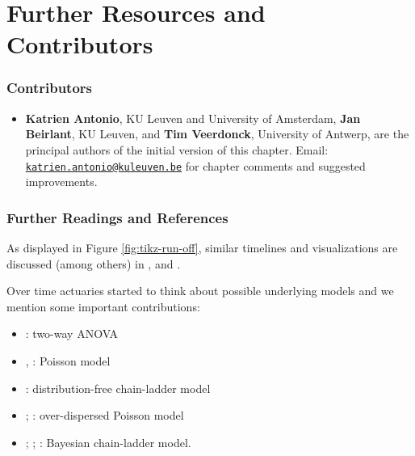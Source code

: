 \documentclass[]{book}
\providecommand{\tightlist}{%
  \setlength{\itemsep}{0pt}\setlength{\parskip}{0pt}}
\begin{document}
\section{Further Resources and
Contributors}\label{LossRe:further-reading-and-resources}

\subsubsection*{Contributors}\label{contributors-1}

\begin{itemize}
\tightlist
\item
  \textbf{Katrien Antonio}, KU Leuven and University of Amsterdam,
  \textbf{Jan Beirlant}, KU Leuven, and \textbf{Tim Veerdonck},
  University of Antwerp, are the principal authors of the initial
  version of this chapter. Email:
  \href{mailto:katrien.antonio@kuleuven.be}{\nolinkurl{katrien.antonio@kuleuven.be}}
  for chapter comments and suggested improvements.
\end{itemize}

\subsubsection*{Further Readings and
References}\label{further-readings-and-references}

As displayed in Figure \ref{fig:tikz-run-off}, similar timelines and
visualizations are discussed (among others) in \citet{WuthrichMerz2008},
\citet{AntonioPlat2014} and \citet{WuthrichMerz2015}.

Over time actuaries started to think about possible underlying models
and we mention some important contributions:

\begin{itemize}
\tightlist
\item
  \citet{Kremer1982}: two-way ANOVA
\item
  \citet{Kremer1984}, \citet{Mack1991}: Poisson model
\item
  \citet{Mack1993}: distribution-free chain-ladder model
\item
  \citet{Renshaw1989}; \citet{RenshawVerrall1998}: over-dispersed
  Poisson model
\item
  \citet{Gisler2006}; \citet{GislerWuthrich2008}; \citet{Buhlmann2009}:
  Bayesian chain-ladder model.
\end{itemize}
\end{document}
